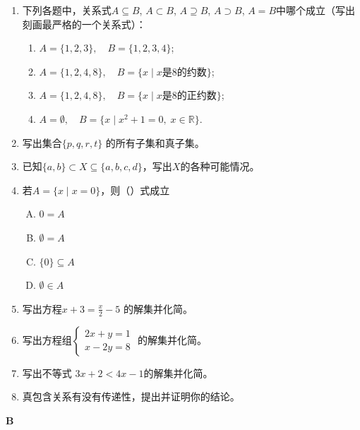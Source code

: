 \begin{enumerate}
\item 下列各题中，关系式$A\subseteq B$, $A\subset B$, $A\supseteq B$, $A\supset B$, $A=B$中哪个成立（写出刻画最严格的一个关系式）：
\begin{enumerate}[(1)]
    \item $A=\{1,2,3\},\quad B=\{1,2,3,4\}$;
    \item $A=\{1,2,4,8\},\quad B=\{x\mid x\text{是8的约数}\}$;
    \item $A=\{1,2,4,8\},\quad B=\{x\mid x\text{是8的正约数}\}$;
    \item $A=\emptyset,\quad B=\{x\mid x^2+1=0,\; x\in\mathbb{R}\}$.
\end{enumerate}

\item 写出集合$\{p,q,r,t\}$
的所有子集和真子集。
\item 已知$\{a,b\}\subset X\subseteq \{a,b,c,d\}$，写出$X$的各种可能情况。
\item 若$A=\{x\mid x=0\}$，则（\qquad）式成立
\begin{multicols}{4}
\begin{enumerate}[(A)]
    \item  $0=A$
    \item $\emptyset =A$
    \item $\{0\}\subseteq A$
    \item $\emptyset \in A$
\end{enumerate}
\end{multicols}

\item 写出方程$x+3=\frac{x}{2}-5$
的解集并化简。

\item 写出方程组$\begin{cases}
    2x+y=1\\  x-2y=8
\end{cases}$
的解集并化简。

\item 写出不等式
$3x+2<4x-1$的解集并化简。
\item 真包含关系有没有传递性，提出并证明你的结论。
\end{enumerate}

\begin{center}
    \bfseries B
\end{center}

